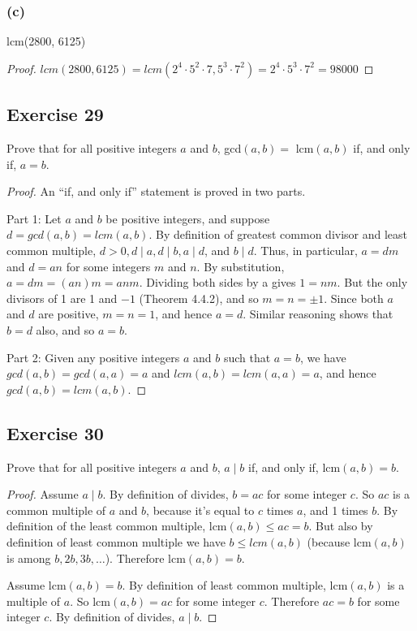 \documentclass[14pt]{extarticle}
\begin{document}
\subsubsection{(c)}
lcm(2800, 6125)

\begin{proof}
$lcm(2800, 6125) = lcm(2^4 \cdot 5^2 \cdot 7, 5^3 \cdot 7^2) = 2^4 \cdot 5^3 \cdot 7^2 = 98000$
\end{proof}

\subsection{Exercise 29}
Prove that for all positive integers $a$ and $b$, gcd$(a, b) =$ lcm$(a, b)$ if, and only if, $a = b$.

\begin{proof}
An ``if, and only if'' statement is proved in two parts.

Part 1: Let $a$ and $b$ be positive integers, and suppose $d = gcd(a, b) = lcm(a, b)$. By definition of greatest common divisor and least common multiple, $d > 0, d \mid a, d\mid b, a\mid d$, and $b \mid d$. Thus, in particular, $a = dm$ and $d = an$ for some integers $m$ and $n$. By substitution, $a = dm = (an)m = anm$. Dividing both sides by a gives $1 = nm$. But the only divisors of 1 are 1 and $-1$ (Theorem 4.4.2), and so $m = n = \pm 1$. Since both $a$ and $d$ are positive, $m = n = 1$, and hence $a = d$. Similar reasoning shows that $b = d$ also, and so $a = b$.

Part 2: Given any positive integers $a$ and $b$ such that $a = b$, we have $gcd(a, b) = gcd(a, a) = a$ and $lcm(a, b) = lcm(a, a) = a$, and hence $gcd(a, b) = lcm(a, b)$.
\end{proof}

\subsection{Exercise 30}
Prove that for all positive integers $a$ and $b$, $a \mid b$ if, and only if, lcm$(a, b) = b$.

\begin{proof}
Assume $a \mid b$. By definition of divides, $b = ac$ for some integer $c$. So $ac$ is a common multiple of $a$ and $b$, because it's equal to $c$ times $a$, and 1 times $b$. By definition of the least common multiple, lcm$(a,b) \leq ac = b$. But also by definition of least common multiple we have $b \leq lcm(a,b)$ (because lcm$(a,b)$ is among $b, 2b, 3b, \ldots$). Therefore lcm$(a,b) = b$.

Assume lcm$(a, b) = b$. By definition of least common multiple, lcm$(a, b)$ is a multiple of $a$. So lcm$(a, b) = ac$ for some integer $c$. Therefore $ac = b$ for some integer $c$. By definition of divides, $a \mid b$.
\end{proof}
\end{document}
